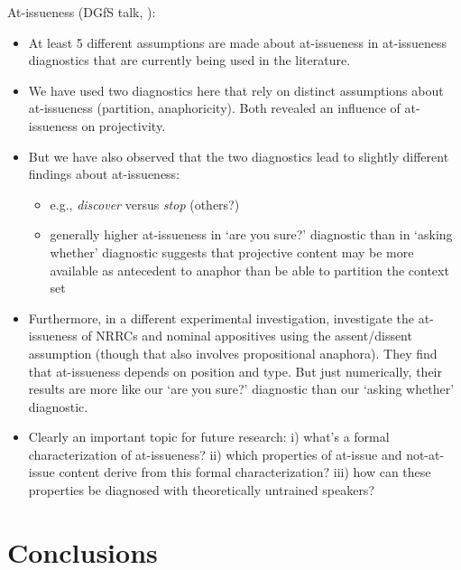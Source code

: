 \documentclass[11pt,fleqn]{article}
\newcommand{\6}{\mbox{$[\hspace*{-.6mm}[$}}
\newcommand{\9}{\mbox{$]\hspace*{-.6mm}]$}}
\begin{document}
\begin{itemize}
At-issueness (DGfS talk, \citealt{tonhauser-dgfs2017}):

\begin{itemize}

\item At least 5 different assumptions are made about at-issueness in at-issueness diagnostics that are currently being used in the literature.

\item We have used two diagnostics here that rely on distinct assumptions about at-issueness (partition, anaphoricity). Both revealed an influence of at-issueness on projectivity.

\item But we have also observed that the two diagnostics lead to slightly different findings about at-issueness:

\begin{itemize}

\item e.g., {\em discover} versus {\em stop} (others?)

\item generally higher at-issueness in `are you sure?' diagnostic than in `asking whether' diagnostic suggests that projective content may be more available as antecedent to anaphor than be able to partition the context set

\end{itemize}

\item Furthermore, in a different experimental investigation, \citealt{syrett-koev2015} investigate the at-issueness of NRRCs and nominal appositives using the assent/dissent assumption (though that also involves propositional anaphora). They find that at-issueness depends on position and type. But just numerically, their results are more like our `are you sure?' diagnostic than our `asking whether' diagnostic.

\item Clearly an important topic for future research: i) what's a formal characterization of at-issueness? ii) which properties of at-issue and not-at-issue content derive from this formal characterization? iii) how can these properties be diagnosed with theoretically untrained speakers? 

\end{itemize}


\section{Conclusions}\label{s6}


\end{itemize}
\end{document}
